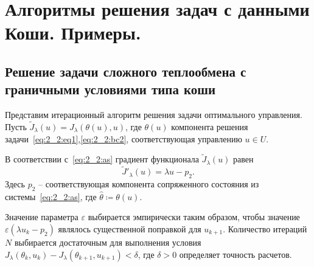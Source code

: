 \section{Алгоритмы решения задач с данными Коши. Примеры.}\label{sec:ch4/sec4}

\subsection{
    Решение задачи сложного теплообмена
    с граничными условиями типа коши
}\label{subsec:ch4/sec4/subsec1}

Представим итерационный алгоритм решения задачи оптимального управления.
Пусть $\tilde J_\lambda(u)=J_\lambda(\theta(u), u)$, где $\theta(u)$ компонента решения
задачи~\eqref{eq:2_2:eq1},\eqref{eq:2_2:bc2}, соответствующая управлению $u\in U$.

В соответствии с~\eqref{eq:2_2:as} градиент функционала $\tilde J_\lambda(u)$ равен
\[
    \tilde J'_\lambda (u) = \lambda u - p_2.
\]
Здесь $p_2$ -- соответствующая компонента сопряженного
состояния из системы~\eqref{eq:2_2:as}, где $\hat{\theta}\coloneqq\theta(u)$.


Значение параметра $\varepsilon$ выбирается эмпирически таким образом, чтобы значение
$\varepsilon (\lambda u_k - p_2)$ являлось существенной поправкой для $u_{k+1}$.
Количество итераций $N$ выбирается достаточным для выполнения условия
$J_\lambda(\theta_k, u_k) - J_\lambda(\theta_{k+1}, u_{k+1}) < \delta$, где $\delta>0$
определяет точность расчетов.


